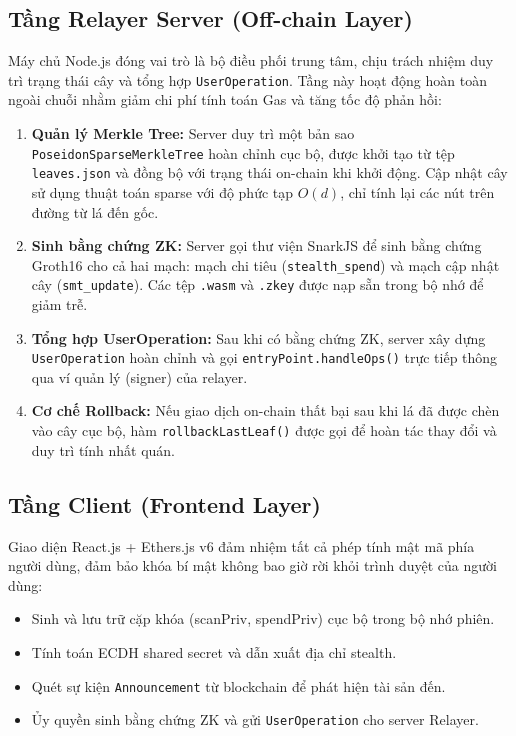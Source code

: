 \documentclass[../DoAn.tex]{subfiles}
\begin{document}
\subsection{Tầng Relayer Server (Off-chain Layer)}
\label{subsec:server_layer}

Máy chủ Node.js đóng vai trò là bộ điều phối trung tâm, chịu trách nhiệm duy trì trạng thái cây và tổng hợp \texttt{UserOperation}. Tầng này hoạt động hoàn toàn ngoài chuỗi nhằm giảm chi phí tính toán Gas và tăng tốc độ phản hồi:

\begin{enumerate}
    \item \textbf{Quản lý Merkle Tree:} Server duy trì một bản sao \texttt{PoseidonSparseMerkleTree} hoàn chỉnh cục bộ, được khởi tạo từ tệp \texttt{leaves.json} và đồng bộ với trạng thái on-chain khi khởi động. Cập nhật cây sử dụng thuật toán sparse với độ phức tạp $O(d)$, chỉ tính lại các nút trên đường từ lá đến gốc.

    \item \textbf{Sinh bằng chứng ZK:} Server gọi thư viện SnarkJS để sinh bằng chứng Groth16 cho cả hai mạch: mạch chi tiêu (\texttt{stealth\_spend}) và mạch cập nhật cây (\texttt{smt\_update}). Các tệp \texttt{.wasm} và \texttt{.zkey} được nạp sẵn trong bộ nhớ để giảm trễ.

    \item \textbf{Tổng hợp UserOperation:} Sau khi có bằng chứng ZK, server xây dựng \texttt{UserOperation} hoàn chỉnh và gọi \texttt{entryPoint.handleOps()} trực tiếp thông qua ví quản lý (signer) của relayer.

    \item \textbf{Cơ chế Rollback:} Nếu giao dịch on-chain thất bại sau khi lá đã được chèn vào cây cục bộ, hàm \texttt{rollbackLastLeaf()} được gọi để hoàn tác thay đổi và duy trì tính nhất quán.
\end{enumerate}

\subsection{Tầng Client (Frontend Layer)}
\label{subsec:client_layer}

Giao diện React.js + Ethers.js v6 đảm nhiệm tất cả phép tính mật mã phía người dùng, đảm bảo khóa bí mật không bao giờ rời khỏi trình duyệt của người dùng:

\begin{itemize}
    \item Sinh và lưu trữ cặp khóa (scanPriv, spendPriv) cục bộ trong bộ nhớ phiên.
    \item Tính toán ECDH shared secret và dẫn xuất địa chỉ stealth.
    \item Quét sự kiện \texttt{Announcement} từ blockchain để phát hiện tài sản đến.
    \item Ủy quyền sinh bằng chứng ZK và gửi \texttt{UserOperation} cho server Relayer.
\end{itemize}
\end{document}
